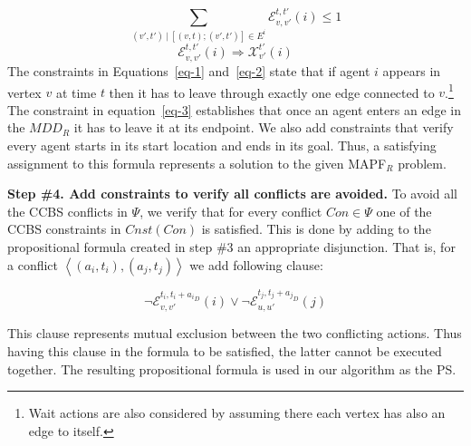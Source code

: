\documentclass[review]{elsarticle}
\newcommand{\tuple}[1]{\ensuremath{\left \langle #1 \right \rangle }}
\newcommand{\mddr}{\ensuremath{MDD_R}\xspace}
\newcommand{\ccbs}{\ac{CCBS}\xspace}
\newcommand{\ps}{\ac{PS}\xspace}
\newcommand{\mapfr}{\ac{MAPF}$_R$\xspace}
\begin{document}
\begin{equation}
{  \sum_{(v',t')\:|\:[(v,t);(v',t')] \in E^i }{\mathcal{E}_{v,v'}^{t,t'}{(i)} \leq 1}
}
\label{eq-2}
\end{equation}
\begin{equation}
{  \mathcal{E}_{v,v'}^{t,t'}(i) \Rightarrow \mathcal{X}_{v'}^{t'}(i)
}
\label{eq-3}
\end{equation}
The constraints in Equations~\ref{eq-1} and~\ref{eq-2} state that if agent $i$ appears in vertex $v$ at time $t$ then it has to leave through exactly one edge connected to $v$.\footnote{Wait actions are also considered by assuming there each vertex has also an edge to itself.} 
The constraint in equation~\ref{eq-3} establishes that once an agent enters an edge in the \mddr it has to leave it at its endpoint. 
We also add constraints that verify every agent starts in its start location and ends in its goal.
Thus, a satisfying assignment to this formula represents a solution to the given \mapfr problem. 


\textbf{Step \#4. Add constraints to verify all conflicts are avoided.}
To avoid all the \ccbs conflicts in $\Psi$, we verify that for every conflict $Con\in\Psi$ one of the \ccbs constraints in $Cnst(Con)$ is satisfied. 
This is done by adding to the propositional formula created in step \#3 
an appropriate disjunction. 
That is, for a conflict $\tuple{(a_i,t_i), (a_j, t_j)}$ 
we add following clause:

\begin{equation}
	\neg \mathcal{E}^{t_i, t_i+{a_i}_D}_{v,v'}(i)
\vee
	\neg \mathcal{E}^{t_j, t_j+{a_j}_D}_{u,u'}(j)
\label{eq-mutex}
\end{equation}

This clause represents mutual exclusion between the two conflicting actions. Thus having this clause in the formula to be satisfied, the latter cannot be executed together. The resulting propositional formula is used in our algorithm as the \ps.
\end{document}
